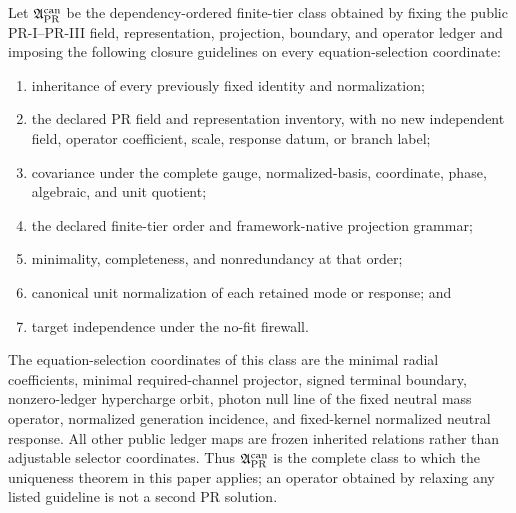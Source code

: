 \begin{proposition}
\label{prop:pr35-complete-certified-class}
Let $\mathfrak A_{\rm PR}^{\rm can}$ be the dependency-ordered finite-tier
class obtained by fixing the public PR-I--PR-III field, representation,
projection, boundary, and operator ledger and imposing the following closure
guidelines on every equation-selection coordinate:
\begin{enumerate}
 \item inheritance of every previously fixed identity and normalization;
 \item the declared PR field and representation inventory, with no new
 independent field, operator coefficient, scale, response datum, or branch
 label;
 \item covariance under the complete gauge, normalized-basis, coordinate,
 phase, algebraic, and unit quotient;
 \item the declared finite-tier order and framework-native projection grammar;
 \item minimality, completeness, and nonredundancy at that order;
 \item canonical unit normalization of each retained mode or response; and
 \item target independence under the no-fit firewall.
\end{enumerate}
The equation-selection coordinates of this class are the minimal radial
coefficients, minimal required-channel projector, signed terminal boundary,
nonzero-ledger hypercharge orbit, photon null line of the fixed neutral mass
operator, normalized generation incidence, and fixed-kernel normalized neutral
response.  All other public ledger maps are frozen inherited relations rather
than adjustable selector coordinates.  Thus $\mathfrak A_{\rm PR}^{\rm can}$
is the complete class to which the uniqueness theorem in this paper applies;
an operator obtained by relaxing any listed guideline is not a second PR
solution.
\end{proposition}

